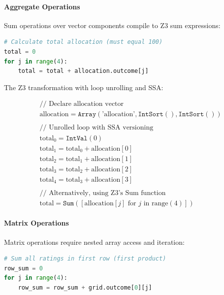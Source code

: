 \paragraph{Aggregate Operations}

Sum operations over vector components compile to Z3 sum expressions:

\begin{lstlisting}[language=Python, numbers=none, caption={Python code with vector sum}]
# Calculate total allocation (must equal 100)
total = 0
for j in range(4):
    total = total + allocation.outcome[j]
\end{lstlisting}

The Z3 transformation with loop unrolling and SSA:

\begin{align*}
& \text{// Declare allocation vector} \\
& \text{allocation} = \texttt{Array}(\text{'allocation'}, \texttt{IntSort}(), \texttt{IntSort}()) \\
\\
& \text{// Unrolled loop with SSA versioning} \\
& \text{total}_0 = \texttt{IntVal}(0) \\
& \text{total}_1 = \text{total}_0 + \text{allocation}[0] \\
& \text{total}_2 = \text{total}_1 + \text{allocation}[1] \\
& \text{total}_3 = \text{total}_2 + \text{allocation}[2] \\
& \text{total}_4 = \text{total}_3 + \text{allocation}[3] \\
\\
& \text{// Alternatively, using Z3's Sum function} \\
& \text{total} = \texttt{Sum}([\text{allocation}[j] \text{ for } j \text{ in range}(4)])
\end{align*}

\paragraph{Matrix Operations}

Matrix operations require nested array access and iteration:

\begin{lstlisting}[language=Python, numbers=none, caption={Python code with matrix row sum}]
# Sum all ratings in first row (first product)
row_sum = 0
for j in range(4):
    row_sum = row_sum + grid.outcome[0][j]
\end{lstlisting}

